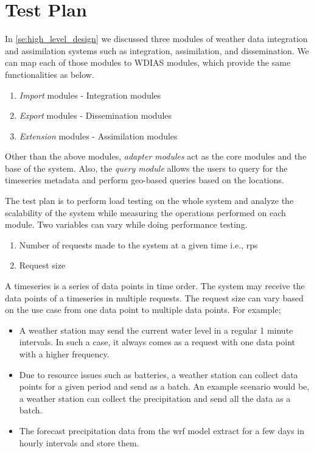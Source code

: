 \section{Test Plan}
\label{se:test_plan}

In \cref{se:high_level_design} we discussed three modules of weather data integration and assimilation systems such as integration, assimilation, and dissemination. We can map each of those modules to WDIAS modules, which provide the same functionalities as below.
\begin{enumerate}
    \item \emph{Import} modules - Integration modules
    \item \emph{Export} modules - Dissemination modules
    \item \emph{Extension} modules - Assimilation modules
\end{enumerate}

Other than the above modules, \emph{adapter modules} act as the core modules and the base of the system. Also, the \emph{query module} allows the users to query for the timeseries metadata and perform geo-based queries based on the locations.

The test plan is to perform load testing on the whole system and analyze the scalability of the system while measuring the operations performed on each module. Two variables can vary while doing performance testing.
\begin{enumerate}
    \item Number of requests made to the system at a given time i.e., \acrfull{rps}
    \item Request size
\end{enumerate}

A timeseries is a series of data points in time order. The system may receive the data points of a timeseries in multiple requests. The request size can vary based on the use case from one data point to multiple data points. For example;
\begin{itemize}
    \item A weather station may send the current water level in a regular 1 minute intervals. In such a case, it always comes as a request with one data point with a higher frequency.
    \item Due to resource issues such as batteries, a weather station can collect data points for a given period and send as a batch. An example scenario would be, a weather station can collect the precipitation and send all the data as a batch.
    \item The forecast precipitation data from the \acrshort{wrf} model extract for a few days in hourly intervals and store them.
\end{itemize}


